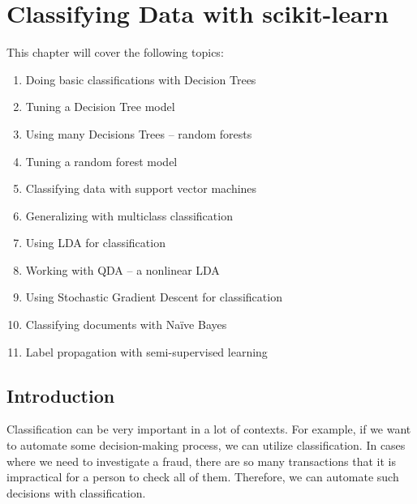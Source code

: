 
\section{Classifying Data with scikit-learn}
This chapter will cover the following topics:
\begin{enumerate}
\item  Doing basic classifications with Decision Trees
\item  Tuning a Decision Tree model
\item  Using many Decisions Trees – random forests
\item  Tuning a random forest model
\item  Classifying data with support vector machines
\item  Generalizing with multiclass classification
\item  Using LDA for classification
\item  Working with QDA – a nonlinear LDA
\item  Using Stochastic Gradient Descent for classification
\item  Classifying documents with Naïve Bayes
\item  Label propagation with semi-supervised learning
\end{enumerate}
\subsection{Introduction}
Classification can be very important in a lot of contexts. For example, if we want to automate
some decision-making process, we can utilize classification. In cases where we need to
investigate a fraud, there are so many transactions that it is impractical for a person to
check all of them. Therefore, we can automate such decisions with classification.

